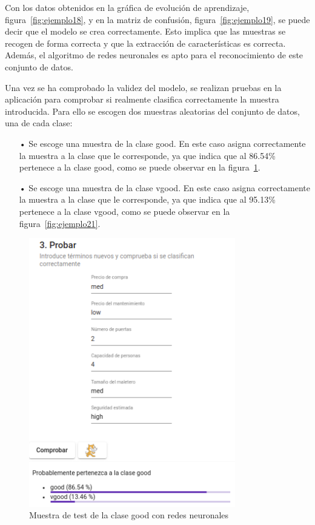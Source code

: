 \documentclass[a4paper, 12pt]{book}
\begin{document}
 
Con los datos obtenidos en la gráfica de evolución de aprendizaje, figura~\ref{fig:ejemplo18}, y en la matriz de confusión, figura~\ref{fig:ejemplo19}, se puede decir que el modelo se crea correctamente. Esto implica que las muestras se recogen de forma correcta y que la extracción de características es correcta. Además, el algoritmo de redes neuronales es apto para el reconocimiento de este conjunto de datos.

Una vez se ha comprobado la validez del modelo, se realizan pruebas en la aplicación para comprobar si realmente clasifica correctamente la muestra introducida. Para ello se escogen dos muestras aleatorias del conjunto de datos, una de cada clase:

\begin{itemize}
\item[•] Se escoge una muestra de la clase good. En este caso asigna correctamente la muestra a la clase que le corresponde, ya que indica que al 86.54\% pertenece a la clase good, como se puede observar en la figura~\ref{fig:ejemplo20}.
\item[•] Se escoge una muestra de la clase vgood. En este caso asigna correctamente la muestra a la clase que le corresponde, ya que indica que al 95.13\% pertenece a la clase vgood, como se puede observar en la figura~\ref{fig:ejemplo21}. 
\end{itemize}

\begin{figure}
	\centering
	\includegraphics[width=9cm, keepaspectratio]{img/good_rn.png}
	\caption{Muestra de test de la clase good con redes neuronales} 	\label{fig:ejemplo20}
\end{figure}
\end{document}
